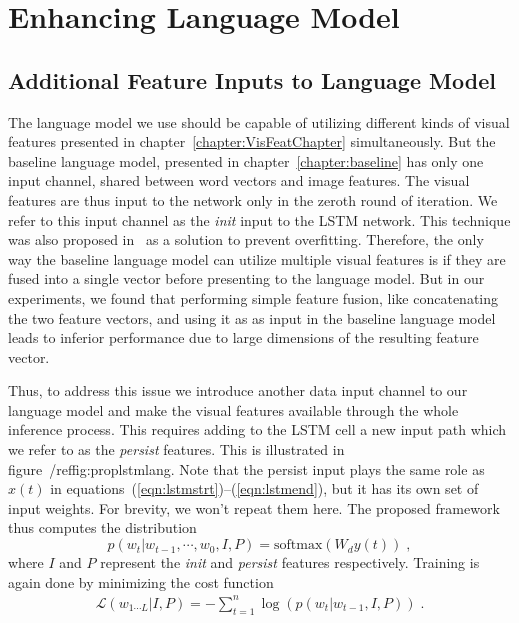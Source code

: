 \chapter{Enhancing Language Model}
\label{chapter:langModel}
\section{Additional Feature Inputs to Language Model}
The language model we use should be capable of utilizing different kinds of
visual features presented in chapter~\ref{chapter:VisFeatChapter}
simultaneously.
But the baseline language model, presented in chapter~\ref{chapter:baseline} has
only one input channel, shared between word vectors and image features.
The visual features are thus input to the network only in the zeroth
round of iteration.
We refer to this input channel as the \emph{init} input to the LSTM network.
This technique was also proposed in~\cite{Vinyals_2015_CVPR} as a solution to
prevent overfitting. 
Therefore, the only way the baseline language model can utilize multiple visual
features is if they are fused into a single vector before presenting to the
language model.
But in our experiments, we found that performing simple feature fusion, like
concatenating the two feature vectors, and using it as as input in the baseline
language model leads to inferior performance due to large dimensions of the
resulting feature vector.

Thus, to address this issue we introduce another data input channel to our
language model and make the visual features available through the whole
inference process.
This requires adding to the LSTM cell a new input path which we refer to as the
\emph{persist} features.
This is illustrated in figure~/ref{fig:proplstmlang}.
Note that the persist input plays the same role as $x(t)$ in
equations~(\ref{eqn:lstmstrt})--(\ref{eqn:lstmend}), but it has its own set of
input weights.
For brevity, we won't repeat them here.
The proposed framework thus computes the distribution
\begin{equation}
p(w_t | w_{t-1},\cdots,w_0, I, P) = \text{softmax}(W_d y(t)) \;,
\end{equation}
\noindent where $I$ and $P$ represent the \emph{init} and \emph{persist}
features respectively.
Training is again done by minimizing the cost function
\begin{align}
  \mathcal{L}(w_{1\cdots L} | I,P) = -\sum_{t=1}^n \log(p(w_t|w_{t-1},I,P)) \; .
\end{align}


